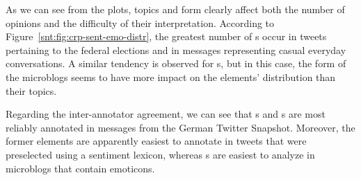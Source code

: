 As we can see from the plots, topics and form clearly affect both the
number of opinions and the difficulty of their interpretation.
According to Figure~\ref{snt:fig:crp-sent-emo-distr}, the greatest
number of s occur in tweets pertaining to the
federal elections and in messages representing casual everyday
conversations.  A similar tendency is observed for s, but in this case, the form of the microblogs seems to have
more impact on the elements' distribution than their topics.


Regarding the inter-annotator agreement, we can see that
s and s are most reliably
annotated in messages from the German Twitter Snapshot.  Moreover, the
former elements are apparently easiest to annotate in tweets that were
preselected using a sentiment lexicon, whereas s
are easiest to analyze in microblogs that contain emoticons.

